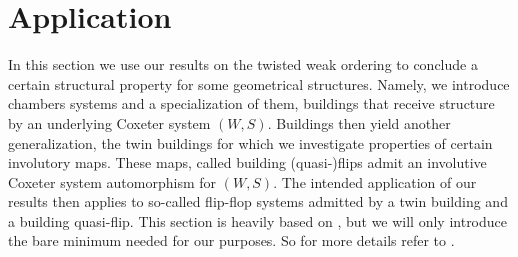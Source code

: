 \section{Application}
\label{sec:application}

In this section we use our results on the twisted weak ordering to conclude a certain structural property for some geometrical structures. Namely, we introduce chambers systems and a specialization of them, buildings that receive structure by an underlying Coxeter system $(W,S)$. Buildings then yield another generalization, the twin buildings for which we investigate properties of certain involutory maps. These maps, called building (quasi-)flips admit an involutive Coxeter system automorphism for $(W,S)$. The intended application of our results then applies to so-called flip-flop systems admitted by a twin building and a building quasi-flip. This section is heavily based on \cite{horn:kac-moody}, but we will only introduce the bare minimum needed for our purposes. So for more details refer to \cite{horn:kac-moody}.





